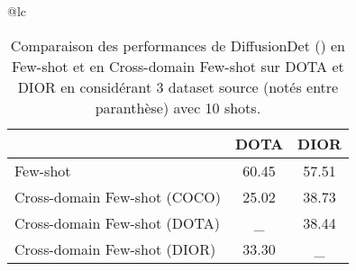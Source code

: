 \begin{table}[h]

    \label{tab:comparison}
    \begin{adjustbox}{width=0.75\textwidth}
        \begin{tabular}{@{}lc}
            \begin{tabular}{@{}lcc}
                \toprule[1pt]
                & \textbf{DOTA} & \textbf{DIOR} \\ \hline
                Few-shot              & 60.45         & 57.51         \\
                Cross-domain Few-shot (COCO) & 25.02         & 38.73         \\\bottomrule[1pt]
                Cross-domain Few-shot (DOTA) & \_         & 38.44         \\\bottomrule[1pt]
                Cross-domain Few-shot (DIOR) & 33.30         & \_         \\\bottomrule[1pt]
            \end{tabular}%
        \end{tabular}%
    \end{adjustbox}
    \caption{Comparaison des performances de DiffusionDet (\cite{chen2022diffusiondet}) en Few-shot et en Cross-domain Few-shot sur DOTA et DIOR en considérant 3 dataset source (notés entre paranthèse) avec 10 shots.}

\end{table}